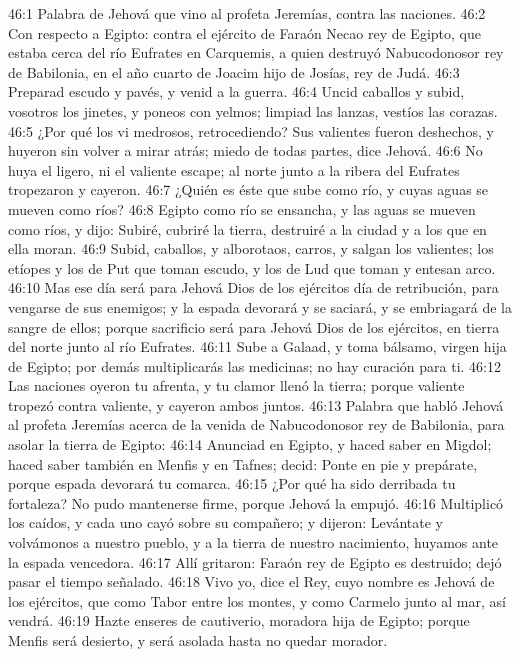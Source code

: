46:1 Palabra de Jehová que vino al profeta Jeremías, contra las naciones. 
46:2 Con respecto a Egipto: contra el ejército de Faraón Necao rey de Egipto, que estaba cerca del río Eufrates en Carquemis, a quien destruyó Nabucodonosor rey de Babilonia, en el año cuarto de Joacim hijo de Josías, rey de Judá. 
46:3 Preparad escudo y pavés, y venid a la guerra. 
46:4 Uncid caballos y subid, vosotros los jinetes, y poneos con yelmos; limpiad las lanzas, vestíos las corazas. 
46:5 ¿Por qué los vi medrosos, retrocediendo? Sus valientes fueron deshechos, y huyeron sin volver a mirar atrás; miedo de todas partes, dice Jehová. 
46:6 No huya el ligero, ni el valiente escape; al norte junto a la ribera del Eufrates tropezaron y cayeron. 
46:7 ¿Quién es éste que sube como río, y cuyas aguas se mueven como ríos? 
46:8 Egipto como río se ensancha, y las aguas se mueven como ríos, y dijo: Subiré, cubriré la tierra, destruiré a la ciudad y a los que en ella moran. 
46:9 Subid, caballos, y alborotaos, carros, y salgan los valientes; los etíopes y los de Put que toman escudo, y los de Lud que toman y entesan arco. 
46:10 Mas ese día será para Jehová Dios de los ejércitos día de retribución, para vengarse de sus enemigos; y la espada devorará y se saciará, y se embriagará de la sangre de ellos; porque sacrificio será para Jehová Dios de los ejércitos, en tierra del norte junto al río Eufrates. 
46:11 Sube a Galaad, y toma bálsamo, virgen hija de Egipto; por demás multiplicarás las medicinas; no hay curación para ti. 
46:12 Las naciones oyeron tu afrenta, y tu clamor llenó la tierra; porque valiente tropezó contra valiente, y cayeron ambos juntos. 
46:13 Palabra que habló Jehová al profeta Jeremías acerca de la venida de Nabucodonosor rey de Babilonia, para asolar la tierra de Egipto: 
46:14 Anunciad en Egipto, y haced saber en Migdol; haced saber también en Menfis y en Tafnes; decid: Ponte en pie y prepárate, porque espada devorará tu comarca. 
46:15 ¿Por qué ha sido derribada tu fortaleza? No pudo mantenerse firme, porque Jehová la empujó. 
46:16 Multiplicó los caídos, y cada uno cayó sobre su compañero; y dijeron: Levántate y volvámonos a nuestro pueblo, y a la tierra de nuestro nacimiento, huyamos ante la espada vencedora. 
46:17 Allí gritaron: Faraón rey de Egipto es destruido; dejó pasar el tiempo señalado. 
46:18 Vivo yo, dice el Rey, cuyo nombre es Jehová de los ejércitos, que como Tabor entre los montes, y como Carmelo junto al mar, así vendrá. 
46:19 Hazte enseres de cautiverio, moradora hija de Egipto; porque Menfis será desierto, y será asolada hasta no quedar morador. 
